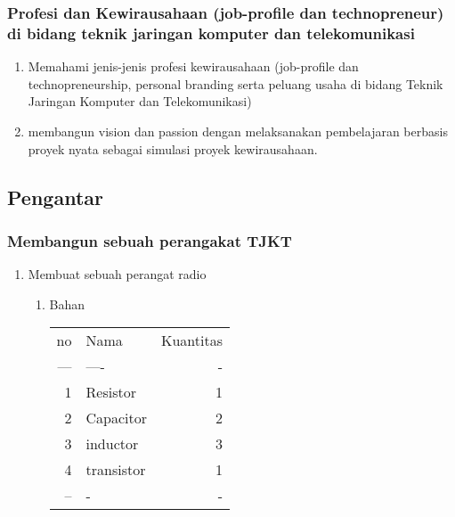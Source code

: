 \documentclass[11pt]{article}
\begin{document}
\subsubsection{Profesi dan Kewirausahaan (job-profile  dan technopreneur) di bidang teknik jaringan komputer dan telekomunikasi}
\label{sec:orgfcb0623}
\begin{enumerate}
\item Memahami jenis-jenis profesi kewirausahaan (job-profile dan technopreneurship, personal branding serta peluang usaha di bidang Teknik Jaringan Komputer dan Telekomunikasi)
\label{sec:orgbaa0241}
\item membangun vision dan passion dengan melaksanakan pembelajaran berbasis proyek nyata sebagai simulasi proyek kewirausahaan.
\label{sec:org6a9a35e}
\end{enumerate}

\subsection{Pengantar}
\label{sec:orgc9b8945}
\subsubsection{Membangun sebuah perangakat TJKT}
\label{sec:orgcd45f1e}
\begin{enumerate}
\item Membuat sebuah perangat radio
\label{sec:org94fc9d1}
\begin{enumerate}
\item Bahan
\label{sec:org89c58c4}
\begin{center}
\begin{tabular}{rlr}
no & Nama & Kuantitas\\
--- & ---- & -\\
1 & Resistor & 1\\
2 & Capacitor & 2\\
3 & inductor & 3\\
4 & transistor & 1\\
-- & - & -\\
\end{tabular}
\end{center}
\end{enumerate}
\end{enumerate}
\end{document}

